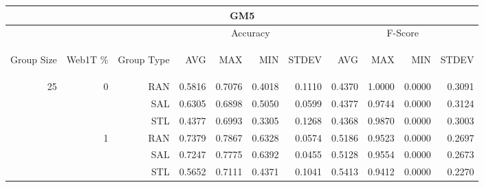 \begin{center}
\begin{table}[htbp]
\begin{tabular}{ | r | r | r | r | r | r | r | r | r | r | r |}
\hline
\multicolumn{11}{|c|}{GM5}\\
\hline
 & & & \multicolumn{4}{|c|}{Accuracy} & \multicolumn{4}{|c|}{F-Score}\\ \cline{4-11}
\begin{sideways}Group Size\end{sideways} & \begin{sideways}Web1T \%\end{sideways} & \begin{sideways}Group Type\end{sideways} & \begin{sideways}AVG\end{sideways} & \begin{sideways}MAX\end{sideways} & \begin{sideways}MIN\end{sideways} & \begin{sideways}STDEV\end{sideways} & \begin{sideways}AVG\end{sideways} & \begin{sideways}MAX\end{sideways} & \begin{sideways}MIN\end{sideways} & \begin{sideways}STDEV\end{sideways}\\
\hline
\multirow{12}{*}{25}
 & \multirow{3}{*}{0} & RAN & 0.5816 & 0.7076 & 0.4018 & 0.1110 & 0.4370 & 1.0000 & 0.0000 & 0.3091\\ \cline{3-11}
 &   & SAL & 0.6305 & 0.6898 & 0.5050 & 0.0599 & 0.4377 & 0.9744 & 0.0000 & 0.3124\\ \cline{3-11}
 &   & STL & 0.4377 & 0.6993 & 0.3305 & 0.1268 & 0.4368 & 0.9870 & 0.0000 & 0.3003\\ \cline{2-11}
 & \multirow{3}{*}{1} & RAN & 0.7379 & 0.7867 & 0.6328 & 0.0574 & 0.5186 & 0.9523 & 0.0000 & 0.2697\\ \cline{3-11}
 &   & SAL & 0.7247 & 0.7775 & 0.6392 & 0.0455 & 0.5128 & 0.9554 & 0.0000 & 0.2673\\ \cline{3-11}
 &   & STL & 0.5652 & 0.7111 & 0.4371 & 0.1041 & 0.5413 & 0.9412 & 0.0000 & 0.2270\\ \cline{2-11}

\end{tabular}
\end{table}
\end{center}
